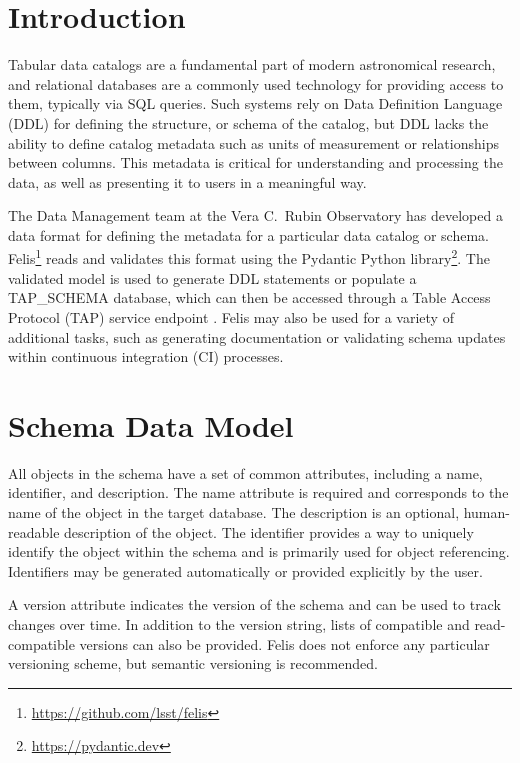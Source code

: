 \documentclass[11pt,twoside]{article}
\begin{document}
\section{Introduction}

Tabular data catalogs are a fundamental part of modern astronomical research, and relational databases are a commonly used technology for providing access to them, typically via SQL queries.
Such systems rely on Data Definition Language (DDL) for defining the structure, or schema of the catalog, but DDL lacks the ability to define catalog metadata such as units of measurement or relationships between columns.
This metadata is critical for understanding and processing the data, as well as presenting it to users in a meaningful way.

The Data Management team at the Vera C.\ Rubin Observatory \citep{2019ApJ...873..111I} has developed a data format for defining the metadata for a particular data catalog or schema.
Felis\footnote{\url{https://github.com/lsst/felis}} reads and validates this format using the Pydantic Python library\footnote{\url{https://pydantic.dev}}.
The validated model is used to generate DDL statements or populate a TAP\_SCHEMA database, which can then be accessed through a Table Access Protocol (TAP) service endpoint \citep{2019ivoa.spec.0927D}.
Felis may also be used for a variety of additional tasks, such as generating documentation or validating schema updates within continuous integration (CI) processes.

\section{Schema Data Model}


All objects in the schema have a set of common attributes, including a name, identifier, and description.
The name attribute is required and corresponds to the name of the object in the target database.
The description is an optional, human-readable description of the object.
The identifier provides a way to uniquely identify the object within the schema and is primarily used for object referencing.
Identifiers may be generated automatically or provided explicitly by the user.

A version attribute indicates the version of the schema and can be used to track changes over time.
In addition to the version string, lists of compatible and read-compatible versions can also be provided.
Felis does not enforce any particular versioning scheme, but semantic versioning is recommended.
\end{document}
